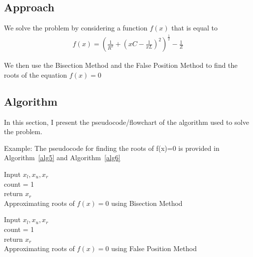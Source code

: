\documentclass[titlepage, 11pt]{article}
\begin{document}
\subsection{Approach}

We solve the problem by considering a function $f(x)$ that is equal to 
\begin{align}
    f(x) = (\frac{1}{R^2} + (xC-\frac{1}{xL})^2)^{\frac{1}{2}} - \frac{1}{Z}
\end{align}

We then use the Bisection Method and the False Position Method to find the roots of the equation $f(x)=0$


\subsection{Algorithm}
In this section, I present the pseudocode/flowchart of the algorithm used to solve the problem.

Example: The pseudocode for finding the roots of f(x)=0 is provided in Algorithm~\ref{alg5} and Algorithm~\ref{alg6}
\begin{center}
\begin{algorithm}[H]\label{alg5}

\SetAlgoLined

Input $x_l,x_u,x_r$ \\
count = 1 \\
return $x_r$ \\
 \caption{Approximating roots of $f(x)=0$ using Bisection Method}
\end{algorithm} 
\begin{algorithm}[H]\label{alg6}

\SetAlgoLined

Input $x_l,x_u,x_r$ \\
count = 1 \\
return $x_r$ \\
\caption{Approximating roots of $f(x)=0$ using False Position Method}
\end{algorithm}    
\end{center}
\end{document}
